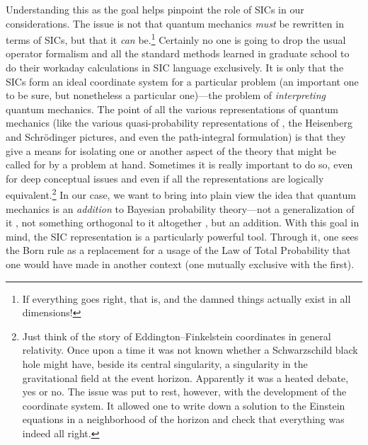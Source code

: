 \documentclass[aps,pra,superscriptaddress,12pt,tightenlines,nofootinbib]{revtex4-2}
\begin{document}
Understanding this as the goal helps pinpoint the role of SICs in our considerations.  The issue is not that quantum mechanics {\it must\/} be rewritten in terms of SICs, but that it {\it can\/} be.\footnote{If everything goes right, that is, and the damned things actually exist in all dimensions!}  Certainly no one is going to drop the usual operator formalism and all the standard methods learned in graduate school to do their workaday calculations in SIC language exclusively.  It is only that the SICs form an ideal coordinate system for a particular problem (an important one to be sure, but nonetheless a particular one)---the problem of {\it interpreting\/} quantum mechanics.  The point of all the various representations of quantum mechanics (like the various quasi-probability representations of \cite{Ferrie09}, the Heisenberg and Schr\"odinger pictures, and even the path-integral formulation) is that they give a means for isolating one or another aspect of the theory that might be called for by a problem at hand.  Sometimes it is really important to do so, even for deep conceptual issues and even if all the representations are logically equivalent.\footnote{Just think of the story of Eddington--Finkelstein coordinates in general relativity.  Once upon a time it was not known whether a Schwarzschild black hole might have, beside its central singularity, a singularity in the gravitational field at the event horizon.  Apparently it was a heated debate, yes or no. The issue was put to rest, however, with the development of the coordinate system.  It allowed one to write down a solution to the Einstein equations in a neighborhood of the horizon and check that everything was indeed all right.}  In our case, we want to bring into plain view the idea that quantum mechanics is an {\it addition\/} to Bayesian probability theory---not a generalization of it \cite{Bub07}, not something orthogonal to it altogether \cite{Jozsa04}, but an addition.  With this goal in mind, the SIC representation is a particularly powerful tool.  Through it, one sees the Born rule as a replacement for a usage of the Law of Total Probability that one would have made in another context (one mutually exclusive with the first).
\end{document}

